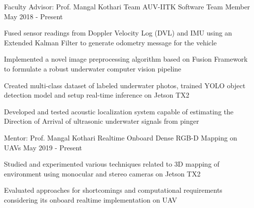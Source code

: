 
\begin{cventries}

 \cventry
    {Faculty Advisor: Prof. Mangal Kothari}
    {Team AUV-IITK}
    {Software Team Member}
    {May 2018 - Present}
    {
      \begin{cvitems}
        \item{Fused sensor readings from Doppler Velocity Log (DVL) and IMU using an Extended Kalman Filter to generate odometry message for the vehicle}
        \item{Implemented a novel image preprocessing algorithm based on Fusion Framework to formulate a robust underwater computer vision pipeline}
        \item{Created multi-class dataset of labeled underwater photos, trained YOLO object detection model and setup real-time inference on Jetson TX2}
        \item{Developed and tested acoustic localization system capable of estimating the Direction of Arrival of ultrasonic underwater signals from pinger}
      \end{cvitems}
    }
   \cventry
    {Mentor: Prof. Mangal Kothari}
    {Realtime Onboard Dense RGB-D Mapping on UAVs}
    {}
    {May 2019 - Present}
    {
      \begin{cvitems}
        \item {Studied and experimented various techniques related to 3D mapping of environment using monocular and stereo cameras on Jetson TX2}
        \item {Evaluated approaches for shortcomings and computational requirements considering its onboard realtime implementation on UAV}
      \end{cvitems}
    }


\end{cventries}
